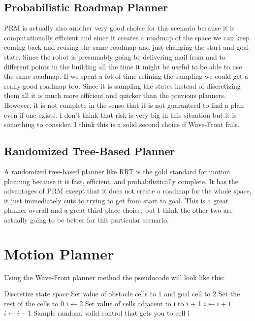 \documentclass{article}
\begin{document}
\subsection{Probabilistic Roadmap Planner}

PRM is actually also another very good choice for this scenario because it is computationally efficient and since it creates a roadmap of the space we can keep coming back and reusing the same roadmap and just changing the start and goal state.
Since the robot is presumably going be delivering mail from and to different points in the building all the time it might be useful to be able to use the same roadmap.
If we spent a lot of time refining the sampling we could get a really good roadmap too.
Since it is sampling the states instead of discretizing them all it is much more efficient and quicker than the previous planners.
However, it is not complete in the sense that it is not guaranteed to find a plan even if one exists.
I don't think that risk is very big in this situation but it is something to consider.
I think this is a solid second choice if Wave-Front fails.

\subsection{Randomized Tree-Based Planner}

A randomized tree-based planner like RRT is the gold standard for motion planning because it is fast, efficient, and probabilistically complete.
It has the advantages of PRM except that it does not create a roadmap for the whole space, it just immediately cuts to trying to get from start to goal.
This is a great planner overall and a great third place choice, but I think the other two are actually going to be better for this particular scenario.

\section{Motion Planner}

Using the Wave-Front planner method the pseudocode will look like this:

\begin{algorithm}[H]
    \begin{algorithmic}[1]
        \STATE Discretize state space
        \STATE Set value of obstacle cells to 1 and goal cell to 2
        \STATE Set the rest of the cells to 0
        \STATE $i \gets 2$
            \STATE Set value of cells adjacent to i to i + 1
            \STATE $i \gets i + 1$
        \ENDWHILE
            \STATE $i \gets i - 1$
            \STATE Sample random, valid control that gets you to cell i
        \ENDWHILE
    \end{algorithmic}
\end{algorithm}
\end{document}
